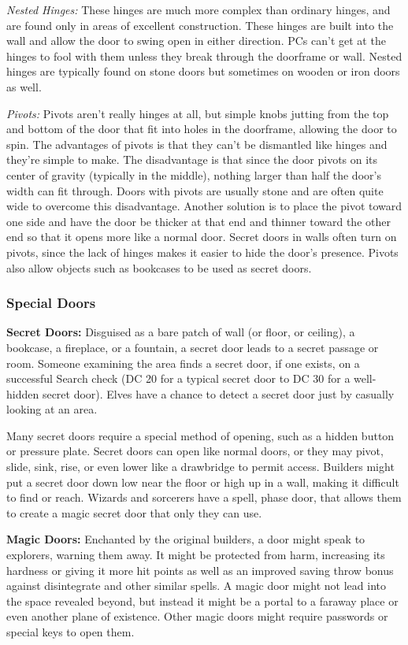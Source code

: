 \textit{Nested Hinges:} These hinges are much more complex than ordinary hinges, and are found only in areas of excellent construction. These hinges are built into the wall and allow the door to swing open in either direction. PCs can't get at the hinges to fool with them unless they break through the doorframe or wall. Nested hinges are typically found on stone doors but sometimes on wooden or iron doors as well.

\textit{Pivots:} Pivots aren't really hinges at all, but simple knobs jutting from the top and bottom of the door that fit into holes in the doorframe, allowing the door to spin. The advantages of pivots is that they can't be dismantled like hinges and they're simple to make. The disadvantage is that since the door pivots on its center of gravity (typically in the middle), nothing larger than half the door's width can fit through. Doors with pivots are usually stone and are often quite wide to overcome this disadvantage. Another solution is to place the pivot toward one side and have the door be thicker at that end and thinner toward the other end so that it opens more like a normal door. Secret doors in walls often turn on pivots, since the lack of hinges makes it easier to hide the door's presence. Pivots also allow objects such as bookcases to be used as secret doors.

\subsubsection{Special Doors}

\textbf{Secret Doors:} Disguised as a bare patch of wall (or floor, or ceiling), a bookcase, a fireplace, or a fountain, a secret door leads to a secret passage or room. Someone examining the area finds a secret door, if one exists, on a successful Search check (DC 20 for a typical secret door to DC 30 for a well-hidden secret door). Elves have a chance to detect a secret door just by casually looking at an area.

Many secret doors require a special method of opening, such as a hidden button or pressure plate. Secret doors can open like normal doors, or they may pivot, slide, sink, rise, or even lower like a drawbridge to permit access. Builders might put a secret door down low near the floor or high up in a wall, making it difficult to find or reach. Wizards and sorcerers have a spell, phase door, that allows them to create a magic secret door that only they can use.

\textbf{Magic Doors:} Enchanted by the original builders, a door might speak to explorers, warning them away. It might be protected from harm, increasing its hardness or giving it more hit points as well as an improved saving throw bonus against disintegrate and other similar spells. A magic door might not lead into the space revealed beyond, but instead it might be a portal to a faraway place or even another plane of existence. Other magic doors might require passwords or special keys to open them.

